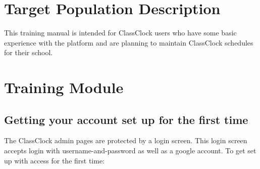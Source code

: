 \documentclass{article}
\begin{document}
\section{Target Population Description}
{This training manual is intended for ClassClock users who have some basic experience with the platform and are planning
to maintain ClassClock schedules for their school.}

\newpage
\section{Training Module}


\secttoc

\bigskip

\subsection{Getting your account set up for the first time}
{The ClassClock admin pages are protected by a login screen. This login screen accepts login with username-and-password
as well as a google account. To get set up with access for the first time:}
\end{document}
